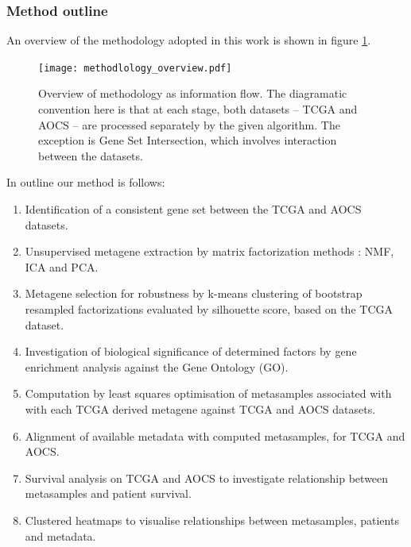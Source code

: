 \documentclass[draft, tikz, 12pt,a4paper,oneside,fleqn]{article}
\begin{document}
\subsubsection{Method outline}
An overview of the methodology adopted in this work is shown in figure \ref{fig-method-overview}.

\begin{figure}[ht]
\begin{center}
\texttt{[image: methodlology\_overview.pdf]}
\end{center}
\caption{Overview of methodology as information flow.  The diagramatic convention here is that at each stage, both datasets -- TCGA and AOCS -- are processed separately by the given algorithm.  The exception is Gene Set Intersection, which involves interaction between the datasets.}
\label{fig-method-overview}
\end{figure}
In outline our method is follows:
\begin{enumerate}
\item
Identification of a consistent gene set between the TCGA and AOCS datasets.
\item
Unsupervised metagene extraction by matrix factorization methods : NMF, ICA and PCA.
\item
Metagene selection for robustness by k-means clustering of bootstrap resampled factorizations evaluated by silhouette score, based on the TCGA dataset.
\item
Investigation of biological significance of determined factors by gene enrichment analysis against the Gene Ontology (GO).
\item
Computation by least squares optimisation of metasamples associated with with each TCGA derived metagene against TCGA and AOCS datasets.
\item
Alignment of available metadata with computed metasamples, for TCGA and AOCS.
\item 
Survival analysis on TCGA and AOCS to investigate relationship between metasamples and patient survival.
\item
Clustered heatmaps to visualise relationships between metasamples, patients and metadata.
\end{enumerate}

\afterpage{\clearpage}
\end{document}
